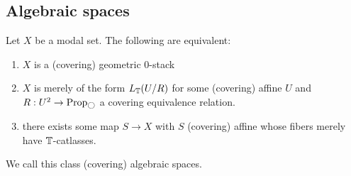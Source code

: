 



\subsection{Algebraic spaces}



%
\begin{theorem}
	Let $X$ be a modal set. The following are equivalent:
	\begin{enumerate}
		\item $X$ is a (covering) geometric 0-stack
		\item $X$ is merely of the form $L_{\mathbb{T}} (U / R)$ for some (covering) affine $U$ and  $R : U^2 \to \Prop_{\ci}$ a covering equivalence relation. 
		\item there exists some map $S \to X$ with $S$ (covering) affine whose fibers merely have $\mathbb{T}$-catlasses.
	\end{enumerate}
	We call this class (covering) algebraic spaces.
\end{theorem}
